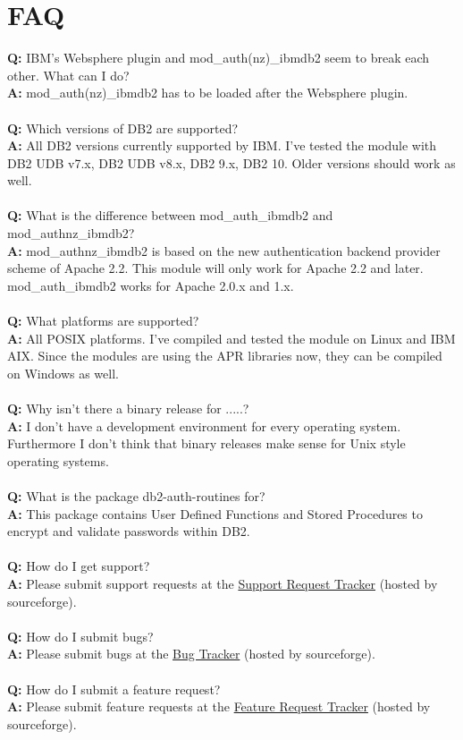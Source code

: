 \section{FAQ}
\textbf{Q:} IBM's Websphere plugin and mod\_auth(nz)\_ibmdb2 seem to break each other. What can I do? \\
\textbf{A:} mod\_auth(nz)\_ibmdb2 has to be loaded after the Websphere plugin. \\
\\
\textbf{Q:} Which versions of DB2 are supported? \\
\textbf{A:} All DB2 versions currently supported by IBM. I've tested the module with DB2 UDB v7.x, DB2 UDB v8.x, DB2 9.x, DB2 10. Older versions should work as well. \\
\\
\textbf{Q:} What is the difference between mod\_auth\_ibmdb2 and mod\_authnz\_ibmdb2? \\
\textbf{A:} mod\_authnz\_ibmdb2 is based on the new authentication backend provider scheme of Apache 2.2. This module will only work for Apache 2.2 and later. \linebreak[4] mod\_auth\_ibmdb2 works for Apache 2.0.x and 1.x. \\
\\
\textbf{Q:} What platforms are supported? \\
\textbf{A:} All POSIX platforms. I've compiled and tested the module on Linux and IBM AIX. Since the modules are using the APR libraries now, they can be compiled on Windows as well. \\
\\
\textbf{Q:} Why isn't there a binary release for .....? \\
\textbf{A:} I don't have a development environment for every operating system. Furthermore I don't think that binary releases make sense for Unix style operating systems. \\
\\
\textbf{Q:} What is the package db2-auth-routines for? \\
\textbf{A:} This package contains User Defined Functions and Stored Procedures to encrypt and validate passwords within DB2. \\
\\
\textbf{Q:} How do I get support? \\
\textbf{A:} Please submit support requests at the \href{http://sourceforge.net/tracker/?atid=633718&group_id=103064&func=browse}{Support Request Tracker} (hosted by sourceforge). \\
\\
\textbf{Q:} How do I submit bugs? \\
\textbf{A:} Please submit bugs at the \href{http://sourceforge.net/tracker/?atid=633717&group_id=103064&func=browse}{Bug Tracker} (hosted by sourceforge). \\
\\
\textbf{Q:} How do I submit a feature request? \\
\textbf{A:} Please submit feature requests at the \href{http://sourceforge.net/tracker/?atid=633720&group_id=103064&func=browse}{Feature Request Tracker} (hosted by sourceforge).

